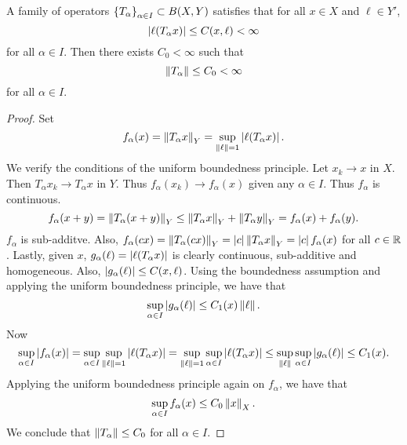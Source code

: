 \begin{theorem}
    A family of operators $\left\{ {T_\alpha} \right\}_{\alpha\in I}\subset B(X,Y)$ satisfies 
    that for all $x\in X$ and $\ell\in Y'$, 
    \begin{equation*}
        \left\lvert {\ell(T_\alpha x)} \right\rvert\leq C(x,\ell) <\infty
    \end{equation*}
    for all $\alpha\in I$. Then there exists $C_0<\infty$ such that  
    \begin{equation*}
        \left\lVert {T_\alpha} \right\rVert\leq C_0<\infty
    \end{equation*}
    for all $\alpha\in I$.
\end{theorem}
\begin{proof}
    Set 
    \begin{equation*}
        f_\alpha(x) = \left\lVert {T_\alpha x} \right\rVert_Y = \sup_{\left\lVert {\ell} \right\rVert=1} \left\lvert {\ell(T_\alpha x)} \right\rvert.
    \end{equation*}
    We verify the conditions of the uniform boundedness principle. Let 
    $x_k\to x$ in $X$. Then $T_\alpha x_k\to T_\alpha x$ in $Y$. Thus 
    $f_\alpha(x_k)\to f_\alpha(x)$ given any $\alpha\in I$. Thus $f_\alpha$ is continuous.
    \begin{equation*}
        f_\alpha(x+y) = \left\lVert {T_\alpha (x+y)} \right\rVert_Y\leq \left\lVert {T_\alpha x} \right\rVert_Y + \left\lVert {T_\alpha y} \right\rVert_Y = f_\alpha(x) + f_\alpha(y).
    \end{equation*}
    $f_\alpha$ is sub-additve. Also, $f_\alpha(cx) = \left\lVert {T_\alpha (cx)} \right\rVert_Y = \left\lvert {c} \right\rvert\left\lVert {T_\alpha x} \right\rVert_Y = \left\lvert {c} \right\rvert f_\alpha(x)$ for all $c\in\mathbb{R}$. 
    Lastly, given $x$, $g_{\alpha}(\ell) = \left\lvert {\ell(T_\alpha x)} \right\rvert$ is clearly continuous, 
    sub-additive and homogeneous. Also, $\left\lvert {g_{\alpha}(\ell)} \right\rvert\leq C(x,\ell)$. Using the 
    boundedness assumption and applying the uniform boundedness principle, we have that 
    \begin{equation*}
        \sup_{\alpha\in I} \left\lvert {g_\alpha(\ell)} \right\rvert \leq C_1(x)\left\lVert {\ell} \right\rVert.
    \end{equation*} 
    Now 
    \begin{equation*}
        \sup_{\alpha\in I} \left\lvert {f_\alpha(x)} \right\rvert = \sup_{\alpha\in I} \sup_{\left\lVert {\ell} \right\rVert=1} \left\lvert {\ell(T_\alpha x)} \right\rvert 
        = \sup_{\left\lVert {\ell} \right\rVert=1} \sup_{\alpha\in I} \left\lvert {\ell(T_\alpha x)} \right\rvert 
        \leq \sup_{\left\lVert {\ell} \right\rVert} \sup_{\alpha\in I} \left\lvert {g_\alpha(\ell)} \right\rvert 
        \leq C_1(x).
    \end{equation*}
    Applying the uniform boundedness principle again on $f_\alpha$, we have that 
    \begin{equation*}
        \sup_{\alpha\in I} f_\alpha(x) \leq C_0\left\lVert {x} \right\rVert_X.
    \end{equation*}
    We conclude that $\left\lVert {T_\alpha} \right\rVert\leq C_0$ for all $\alpha\in I$.
\end{proof}

